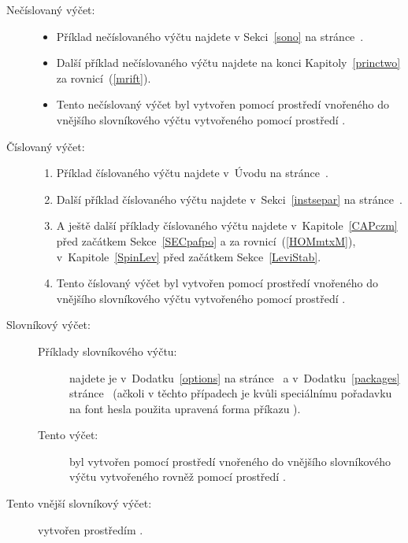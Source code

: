 \begin{description}
\item[Nečíslovaný výčet:]\label{edesciitem} \mbox{}\par
  \begin{itemize}
  \item\label{iitema} Příklad nečíslovaného výčtu najdete v Sekci~\ref{sono}
    na stránce~\pageref{sono}.
  \item\label{iitemb} Další příklad nečíslovaného výčtu najdete na konci
    Kapitoly~\ref{princtwo} za rovnicí~(\ref{mrift}).
  \item\label{iitemc} Tento nečíslovaný výčet byl vytvořen pomocí prostředí
     vnořeného do vnějšího slovníkového výčtu vytvořeného pomocí
    prostředí .
  \end{itemize}
\item[Číslovaný výčet:]\label{edescienum} \mbox{}\par
  \begin{enumerate}
  \item\label{ienuma} Příklad číslovaného výčtu najdete v~Úvodu na
    stránce~\pageref{easyuse}.
  \item\label{ienumb} Další příklad číslovaného výčtu najdete
    v~Sekci~\ref{instsepar} na stránce~\pageref{instsepar}.
  \item\label{ienumc} A ještě další příklady číslovaného výčtu najdete
    v~Kapitole~\ref{CAPczm} před začátkem Sekce~\ref{SECpafpo} a za
    rovnicí~(\ref{HOMmtxM}), v~Kapitole~\ref{SpinLev} před začátkem
    Sekce~\ref{LeviStab}.
  \item\label{ienumd} Tento číslovaný výčet byl vytvořen pomocí prostředí
     vnořeného do vnějšího slovníkového výčtu vytvořeného
    pomocí prostředí .
  \end{enumerate}
\item[Slovníkový výčet:]\label{edescidesc} \mbox{}\par
  \begin{description}
  \item[Příklady slovníkového výčtu:]\label{idesca} najdete je
    v~Dodatku~\ref{options} na stránce~\pageref{options} a
    v~Dodatku~\ref{packages} stránce~\pageref{packages} (ačkoli v těchto
    případech je kvůli speciálnímu pořadavku na font hesla použita upravená
    forma příkazu ).
  \item[Tento výčet:]\label{idescb} byl vytvořen pomocí prostředí
     vnořeného do vnějšího slovníkového výčtu vytvořeného
    rovněž pomocí prostředí .
  \end{description}
\item[Tento vnější slovníkový výčet:]\label{edesc} vytvořen prostředím
  .
\end{description}

